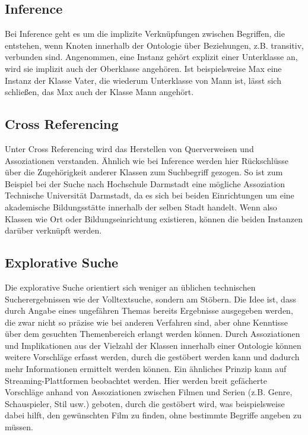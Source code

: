\subsection*{Inference}
Bei Inference geht es um die implizite Verknüpfungen zwischen Begriffen, die entstehen, wenn Knoten innerhalb der Ontologie über Beziehungen, z.B. transitiv, verbunden sind. Angenommen, eine Instanz gehört explizit einer Unterklasse an, wird sie implizit auch der Oberklasse angehören. Ist beispielsweise \glqq Max\grqq{} eine Instanz der Klasse \glqq Vater\grqq{}, die wiederum Unterklasse von \glqq Mann\grqq{} ist, lässt sich schließen, das \glqq Max\grqq{} auch der Klasse \glqq Mann\grqq{} angehört.

\subsection*{Cross Referencing}
Unter Cross Referencing wird das Herstellen von Querverweisen und Assoziationen verstanden. Ähnlich wie bei Inference werden hier Rückschlüsse über die Zugehörigkeit anderer Klassen zum Suchbegriff gezogen. So ist zum Beispiel bei der Suche nach \glqq Hochschule Darmstadt\grqq{} eine mögliche Assoziation \glqq Technische Universität Darmstadt\grqq{}, da es sich bei beiden Einrichtungen um eine akademische Bildungsstätte innerhalb der selben Stadt handelt. Wenn also Klassen wie \glqq Ort\grqq{} oder \glqq Bildungseinrichtung\grqq{} existieren, können die beiden Instanzen darüber verknüpft werden.

\subsection*{Explorative Suche}
Die explorative Suche orientiert sich weniger an üblichen technischen Sucherergebnissen wie der Volltextsuche, sondern am \glqq Stöbern\grqq{}. Die Idee ist, dass durch Angabe eines ungefähren Themas bereits Ergebnisse ausgegeben werden, die zwar nicht so präzise wie bei anderen Verfahren sind, aber ohne Kenntisse über dem gesuchten Themenbereich erlangt werden können. Durch Assoziationen und Implikationen aus der Vielzahl der Klassen innerhalb einer Ontologie können weitere Vorschläge erfasst werden, durch die \glqq gestöbert\grqq{} werden kann und dadurch mehr Informationen ermittelt werden können. Ein ähnliches Prinzip kann auf Streaming-Plattformen beobachtet werden. Hier werden breit gefächerte Vorschläge anhand von Assoziationen zwischen Filmen und Serien (z.B. Genre, Schauspieler, Stil usw.) geboten, durch die \glqq gestöbert\grqq{} wird, was beispielsweise dabei hilft, den gewünschten Film zu finden, ohne bestimmte Begriffe angeben zu müssen.
          
